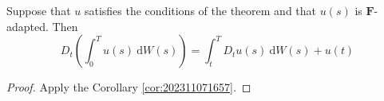 \begin{corollary}\label{cor:202401111429}
	Suppose that $u$ satisfies the conditions of the theorem and that $u(s)$ is $\mathbf{F}$-adapted. Then
	$$
	D_t \left( \int_0^T u(s)~\mathrm{d} W(s) \right) = \int_t^T D_t u(s) ~\mathrm{d} W(s) + u(t)
	$$

\end{corollary}

\begin{proof}
	Apply the Corollary \ref{cor:202311071657}.
\end{proof}

